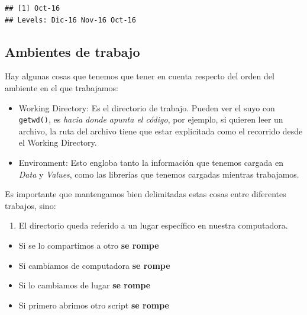 \documentclass[]{book}
\newenvironment{Shaded}{\begin{snugshade}}{\end{snugshade}}
\newcommand{\DecValTok}[1]{\textcolor[rgb]{0.00,0.00,0.81}{#1}}
\newcommand{\NormalTok}[1]{#1}
\newcommand{\OperatorTok}[1]{\textcolor[rgb]{0.81,0.36,0.00}{\textbf{#1}}}
\providecommand{\tightlist}{%
  \setlength{\itemsep}{0pt}\setlength{\parskip}{0pt}}
\begin{document}
\begin{Shaded}
\end{Shaded}

\begin{verbatim}
## [1] Oct-16
## Levels: Dic-16 Nov-16 Oct-16
\end{verbatim}

\hypertarget{ambientes-de-trabajo}{%
\subsection{Ambientes de trabajo}\label{ambientes-de-trabajo}}

Hay algunas cosas que tenemos que tener en cuenta respecto del orden del ambiente en el que trabajamos:

\begin{itemize}
\tightlist
\item
  Working Directory: Es el directorio de trabajo. Pueden ver el suyo con \texttt{getwd()}, es \emph{hacia donde apunta el código}, por ejemplo, si quieren leer un archivo, la ruta del archivo tiene que estar explicitada como el recorrido desde el Working Directory.
\item
  Environment: Esto engloba tanto la información que tenemos cargada en \emph{Data} y \emph{Values}, como las librerías que tenemos cargadas mientras trabajamos.
\end{itemize}

Es importante que mantengamos bien delimitadas estas cosas entre diferentes trabajos, sino:

\begin{enumerate}
\def\labelenumi{\arabic{enumi}.}
\tightlist
\item
  El directorio queda referido a un lugar específico en nuestra computadora.
\end{enumerate}

\begin{itemize}
\tightlist
\item
  Si se lo compartimos a otro \textbf{se rompe}
\item
  Si cambiamos de computadora \textbf{se rompe}
\item
  Si lo cambiamos de lugar \textbf{se rompe}
\item
  Si primero abrimos otro script \textbf{se rompe}
\end{itemize}
\end{document}
